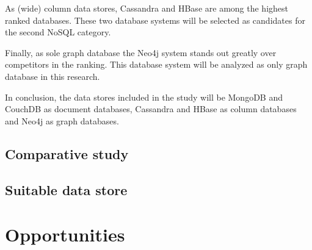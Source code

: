 As (wide) column data stores, Cassandra \autocite{Cassandra2008} and HBase \autocite{HBase2005} are among the highest ranked databases. These two database systems will be selected as candidates for the second NoSQL category.

Finally, as sole graph database the Neo4j system \autocite{Neo4j2007} stands out greatly over competitors in the ranking. This database system will be analyzed as only graph database in this research.

In conclusion, the data stores included in the study will be MongoDB and CouchDB as document databases, Cassandra and HBase as column databases and Neo4j as graph databases.

\subsection{Comparative study}
\label{sec:comparative study}



\subsection{Suitable data store}
\label{sec:suitable-data-store}


\section{Opportunities}
\label{sec:opportunities}


